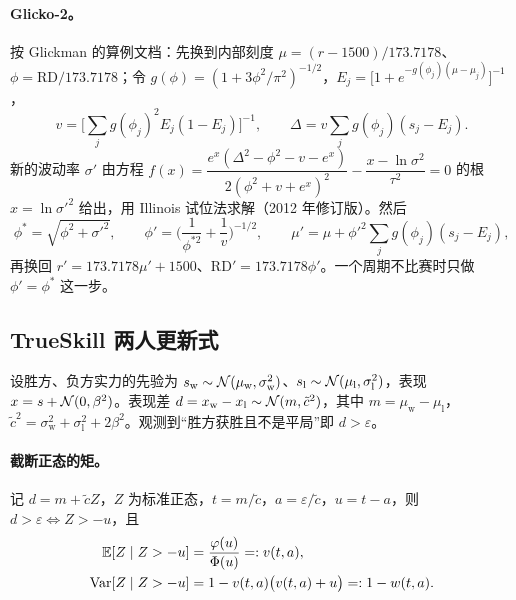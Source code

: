 \paragraph{Glicko-2。}按 Glickman 的算例文档\cite{glickman2022example}：先换到内部刻度 $\mu=(r-1500)/173.7178$、$\phi=\mathrm{RD}/173.7178$；令 $g(\phi)=(1+3\phi^2/\pi^2)^{-1/2}$，$E_j=\big[1+e^{-g(\phi_j)(\mu-\mu_j)}\big]^{-1}$，
\[
  v=\Big[\sum_j g(\phi_j)^2E_j(1-E_j)\Big]^{-1},\qquad
  \Delta=v\sum_j g(\phi_j)(s_j-E_j).
\]
新的波动率 $\sigma'$ 由方程 $f(x)=\dfrac{e^x(\Delta^2-\phi^2-v-e^x)}{2(\phi^2+v+e^x)^2}-\dfrac{x-\ln\sigma^2}{\tau^2}=0$ 的根 $x=\ln\sigma'^2$ 给出，用 Illinois 试位法求解（2012 年修订版）。然后
\[
  \phi^{*}=\sqrt{\phi^2+\sigma'^2},\qquad
  \phi'=\Big(\frac{1}{\phi^{*2}}+\frac{1}{v}\Big)^{-1/2},\qquad
  \mu'=\mu+\phi'^2\sum_j g(\phi_j)(s_j-E_j),
\]
再换回 $r'=173.7178\mu'+1500$、$\mathrm{RD}'=173.7178\phi'$。一个周期不比赛时只做 $\phi'=\phi^*$ 这一步。

\subsection{TrueSkill 两人更新式}\label{app:ch1a-ts}

设胜方、负方实力的先验为 $s_{\mathrm w}\sim\mathcal{N}(\mu_{\mathrm w},\sigma_{\mathrm w}^2)$、$s_{\mathrm l}\sim\mathcal{N}(\mu_{\mathrm l},\sigma_{\mathrm l}^2)$，表现 $x=s+\mathcal{N}(0,\beta^2)$。表现差 $d=x_{\mathrm w}-x_{\mathrm l}\sim\mathcal{N}(m,\tilde c^2)$，其中 $m=\mu_{\mathrm w}-\mu_{\mathrm l}$，$\tilde c^2=\sigma_{\mathrm w}^2+\sigma_{\mathrm l}^2+2\beta^2$。观测到“胜方获胜且不是平局”即 $d>\varepsilon$。

\paragraph{截断正态的矩。}记 $d=m+\tilde cZ$，$Z$ 为标准正态，$t=m/\tilde c$，$a=\varepsilon/\tilde c$，$u=t-a$，则 $d>\varepsilon\Leftrightarrow Z>-u$，且
\begin{align*}
  \mathbb{E}[Z\mid Z>-u]&=\frac{\varphi(u)}{\Phi(u)}=:v(t,a),\\
  \operatorname{Var}[Z\mid Z>-u]&=1-v(t,a)\big(v(t,a)+u\big)=:1-w(t,a).
\end{align*}
